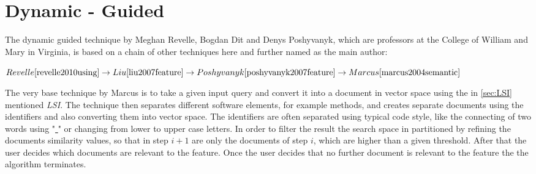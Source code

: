 \section{Dynamic - Guided}
\label{sec:Revelle}
The dynamic guided technique by Meghan Revelle, Bogdan Dit and Denys Poshyvanyk, which are professors at the College of William and Mary in Virginia, is based on a chain of other techniques here and further named as the main author:
\begin{center}
	$Revelle \cite{revelle2010using} \rightarrow Liu \cite{liu2007feature} \rightarrow Poshyvanyk \cite{poshyvanyk2007feature} \rightarrow Marcus \cite{marcus2004semantic}$
\end{center}
The very base technique by Marcus is to take a given input query and convert it into a document in vector space using the in \autoref{sec:LSI} mentioned \textit{LSI}. The technique then separates different software elements, for example methods, and creates separate documents using the identifiers and also converting them into vector space. The identifiers are often separated using typical code style, like the connecting of two words using "\underline{ }" or changing from lower to upper case letters. In order to filter the result the search space in partitioned by refining the documents similarity values, so that in step $i+1$ are only the documents of step $i$, which are higher than a given threshold. After that the user decides which documents are relevant to the feature. Once the user decides that no further document is relevant to the feature the the algorithm terminates. \cite{marcus2004semantic} \newline

